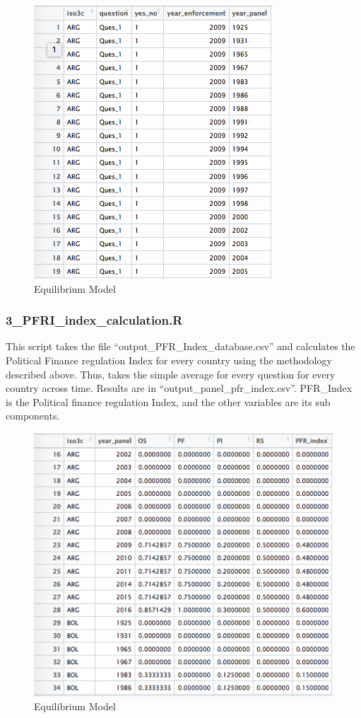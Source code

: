 \documentclass[12,twoside]{article}
\begin{document}
\begin{figure}[htbp]
\centering
\includegraphics{image_2.png}
\caption{Equilibrium Model}
\end{figure}

\subsubsection{3\_PFRI\_index\_calculation.R}\label{pfri_index_calculation.r}

This script takes the file ``output\_PFR\_Index\_database.csv'' and
calculates the Political Finance regulation Index for every country
using the methodology described above. Thus, takes the simple average
for every question for every country across time. Results are in
``output\_panel\_pfr\_index.csv''. PFR\_Index is the Political finance
regulation Index, and the other variables are its sub components.

\begin{figure}[htbp]
\centering
\includegraphics{image_3.png}
\caption{Equilibrium Model}
\end{figure}
\end{document}
